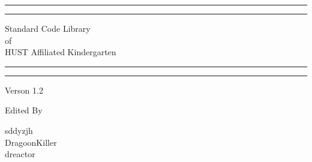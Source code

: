\documentclass[a4paper]{article}
\begin{document}
\begin{titlepage} %

	\centering %
	
	\scshape %
	
	\vspace*{\baselineskip} %
	
	
	\rule{\textwidth}{1.6pt}\vspace*{-\baselineskip}\vspace*{2pt} %
	\rule{\textwidth}{0.4pt} %
	
	\vspace{0.75\baselineskip} %
	
	{\LARGE Standard Code Library\\ of\\ HUST Affiliated Kindergarten\\} %
	
	\vspace{0.75\baselineskip} %
	
	\rule{\textwidth}{0.4pt}\vspace*{-\baselineskip}\vspace{3.2pt} %
	\rule{\textwidth}{1.6pt} %
	
	\vspace{2\baselineskip} %
	
	
	Verson 1.2 %
	
	\vspace*{3\baselineskip} %
	
	
	Edited By
	
	\vspace{0.5\baselineskip} %
	
	{\protect sddyzjh \\ DragoonKiller \\ dreactor \\} %
	

\end{titlepage}
\end{document}
